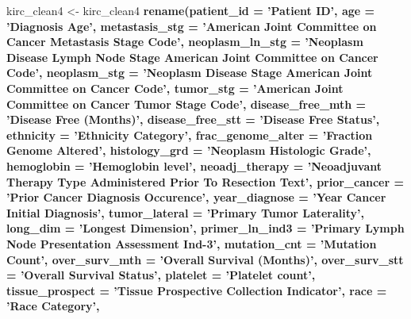 \documentclass[]{article}
\newenvironment{Shaded}{\begin{snugshade}}{\end{snugshade}}
\newcommand{\KeywordTok}[1]{\textcolor[rgb]{0.13,0.29,0.53}{\textbf{#1}}}
\newcommand{\DataTypeTok}[1]{\textcolor[rgb]{0.13,0.29,0.53}{#1}}
\newcommand{\StringTok}[1]{\textcolor[rgb]{0.31,0.60,0.02}{#1}}
\newcommand{\OperatorTok}[1]{\textcolor[rgb]{0.81,0.36,0.00}{\textbf{#1}}}
\newcommand{\NormalTok}[1]{#1}
\begin{document}
\begin{Shaded}
\begin{Highlighting}[]
\NormalTok{kirc_clean4 <-}\StringTok{ }\NormalTok{kirc_clean4 }\OperatorTok{%
\StringTok{     }\KeywordTok{rename}\NormalTok{(}\DataTypeTok{patient_id =} \StringTok{'Patient ID'}\NormalTok{,}
            \DataTypeTok{age =} \StringTok{'Diagnosis Age'}\NormalTok{,}
            \DataTypeTok{metastasis_stg =} \StringTok{'American Joint Committee on Cancer Metastasis Stage Code'}\NormalTok{,}
            \DataTypeTok{neoplasm_ln_stg =} \StringTok{'Neoplasm Disease Lymph Node Stage American Joint Committee on Cancer Code'}\NormalTok{,}
            \DataTypeTok{neoplasm_stg =} \StringTok{'Neoplasm Disease Stage American Joint Committee on Cancer Code'}\NormalTok{,}
            \DataTypeTok{tumor_stg =} \StringTok{'American Joint Committee on Cancer Tumor Stage Code'}\NormalTok{,}
            \DataTypeTok{disease_free_mth =} \StringTok{'Disease Free (Months)'}\NormalTok{,}
            \DataTypeTok{disease_free_stt =} \StringTok{'Disease Free Status'}\NormalTok{,}
            \DataTypeTok{ethnicity =} \StringTok{'Ethnicity Category'}\NormalTok{, }
            \DataTypeTok{frac_genome_alter =} \StringTok{'Fraction Genome Altered'}\NormalTok{,}
            \DataTypeTok{histology_grd =} \StringTok{'Neoplasm Histologic Grade'}\NormalTok{,}
            \DataTypeTok{hemoglobin =} \StringTok{'Hemoglobin level'}\NormalTok{,}
            \DataTypeTok{neoadj_therapy =} \StringTok{'Neoadjuvant Therapy Type Administered Prior To Resection Text'}\NormalTok{,}
            \DataTypeTok{prior_cancer =} \StringTok{'Prior Cancer Diagnosis Occurence'}\NormalTok{,}
            \DataTypeTok{year_diagnose =} \StringTok{'Year Cancer Initial Diagnosis'}\NormalTok{,}
            \DataTypeTok{tumor_lateral =} \StringTok{'Primary Tumor Laterality'}\NormalTok{,}
            \DataTypeTok{long_dim =} \StringTok{'Longest Dimension'}\NormalTok{,}
            \DataTypeTok{primer_ln_ind3 =} \StringTok{'Primary Lymph Node Presentation Assessment Ind-3'}\NormalTok{,}
            \DataTypeTok{mutation_cnt =} \StringTok{'Mutation Count'}\NormalTok{,}
            \DataTypeTok{over_surv_mth =} \StringTok{'Overall Survival (Months)'}\NormalTok{,}
            \DataTypeTok{over_surv_stt =} \StringTok{'Overall Survival Status'}\NormalTok{,}
            \DataTypeTok{platelet =} \StringTok{'Platelet count'}\NormalTok{,}
            \DataTypeTok{tissue_prospect =} \StringTok{'Tissue Prospective Collection Indicator'}\NormalTok{,}
            \DataTypeTok{race =} \StringTok{'Race Category'}\NormalTok{,}
}
\end{Highlighting}
\end{Shaded}
\end{document}
